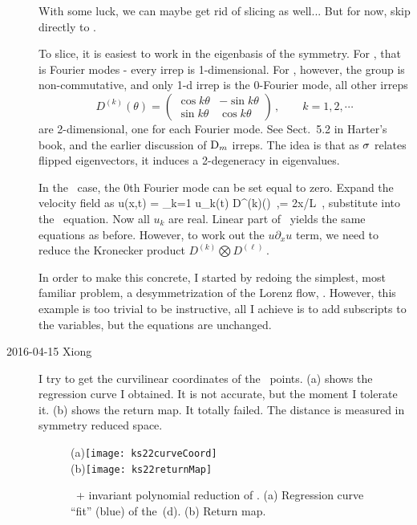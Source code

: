 \begin{description}
{With some luck, we can maybe get rid of slicing as well... But for now,
skip directly to .

To slice, it is easiest to work in the eigenbasis of the symmetry. For
, that is Fourier modes - every irrep is 1-dimensional. For
, however, the group is non-commutative, and only 1-d irrep is the
0-Fourier mode, all other irreps
\[
 D^{(k)}(\theta)= \begin{pmatrix}
                \cos k\theta & -\sin k\theta\\
                \sin k\theta   & \cos k\theta
                  \end{pmatrix}
\,,\qquad k =1,2,\cdots
\]
are 2-dimensional, one for each Fourier mode. See Sect.~5.2 in Harter's
book, and the earlier discussion of $\textrm{D}_{m}$ irreps. The
idea is that as $\sigma$ relates flipped eigenvectors, it induces a
2-degeneracy in eigenvalues.

In the \KS\ case, the $0$th Fourier mode can be set equal to zero. Expand
the velocity field as
\beq
u(x,t) =  \sum_{k=1} u_k(t) D^{(k)}(\theta)
\,,\qquad \theta = 2\pi x/L
\,,
substitute into the \KS\ equation. Now all $u_k$ are real. Linear part of
\KS\ yields the same equations as before. However, to work out the \(
u\partial_x u\) term, we need to reduce the Kronecker product
\(
D^{(k)} \bigotimes D^{(\ell)}
\,.
\)

In order to make this concrete, I started by redoing the simplest,
most familiar problem, a desymmetrization of the Lorenz flow,
. However,
this example is too trivial to be instructive, all I achieve is to add
subscripts to the variables, but the equations are unchanged.
    }

\item[2016-04-15 Xiong] I try to get the curvilinear coordinates
  of the \PoincSec\ points. (a)
  shows the regression curve I obtained. It is not accurate, but
  the moment I tolerate it. (b) shows the return map.
  It totally failed. The distance is measured in symmetry reduced
  space.
  \begin{figure}[h]
    \centering
    (a)\texttt{[image: ks22curveCoord]}
    \\
    (b)\texttt{[image: ks22returnMap]}
    \caption{
    \SFslice\ + invariant polynomial  reduction of .
          (a) Regression curve ``fit'' (blue) of the
      {\PoincSec} \,(d).
      (b) Return map.
    }
    \label{fig:ks22return}
  \end{figure}


\end{description}
